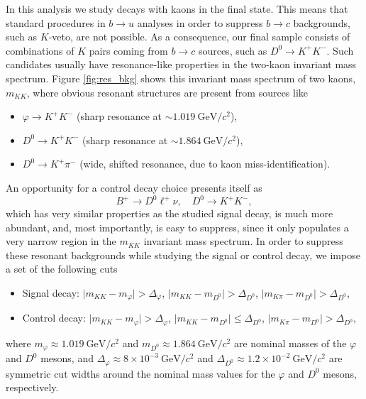 \documentclass[  headings=standardclasses,
  headings=big,oneside,a4paper,openany,12pt]{scrbook}
\newcommand {\e}[1]{\mathrm{~#1}}
\newcommand {\E}[1]{\times 10^{#1}}
\begin{document}
In this analysis we study decays with kaons in the final state. This means that standard procedures in $b \to u$ analyses in order to suppress $b \to c$ backgrounds, such as $K$-veto, are not possible. As a consequence, our final sample consists of combinations of $K$ pairs coming from $b \to c$  sources, such as $D^0 \to K^+ K^-$. Such candidates usually have resonance-like properties in the two-kaon invariant mass spectrum. Figure \ref{fig:res_bkg} shows this invariant mass spectrum of two kaons, $m_{KK}$, where obvious resonant structures are present from sources like
\begin{itemize}
\item $\varphi \to K^+K^-$ (sharp resonance at $\sim1.019\e{GeV}/c^2$),
\item $D^0 \to K^+K^-$ (sharp resonance at $\sim 1.864\e{GeV}/c^2$),
\item $D^0 \to K^+ \pi^-$ (wide, shifted resonance, due to kaon miss-identification).
\end{itemize}

An opportunity for a control decay choice presents itself as $$B^+ \to D^0 \ell^+ \nu, \quad D^0 \to K^+ K^-,$$ which has very similar properties as the studied signal decay, is much more abundant, and, most importantly, is easy to suppress, since it only populates a very narrow region in the $m_{KK}$ invariant mass spectrum. In order to suppress these resonant backgrounds while studying the signal or control decay, we impose a set of the following cuts

\begin{itemize}
\item Signal decay: $\vert m_{KK} - m_{\varphi} \vert > \Delta_\varphi$, $\vert m_{KK} - m_{D^0} \vert > \Delta_{D^0}$, $\vert m_{K\pi} - m_{D^0} \vert > \Delta_{D^0}$,
\item Control decay: $\vert m_{KK} - m_{\varphi} \vert > \Delta_\varphi$, $\vert m_{KK} - m_{D^0} \vert \leq \Delta_{D^0}$, $\vert m_{K\pi} - m_{D^0} \vert > \Delta_{D^0}$,
\end{itemize}

where $m_\varphi \approx 1.019\e{GeV}/c^2$ and $m_{D^0} \approx 1.864\e{GeV}/c^2$ are nominal masses of the $\varphi$ and $D^0$ mesons, and $\Delta_\varphi \approx 8\E{-3}\e{GeV}/c^2$ and $\Delta_{D^0} \approx 1.2\E{-2}\e{GeV}/c^2$ are symmetric cut widths around the nominal mass values for the $\varphi$ and $D^0$ mesons, respectively.
\end{document}
